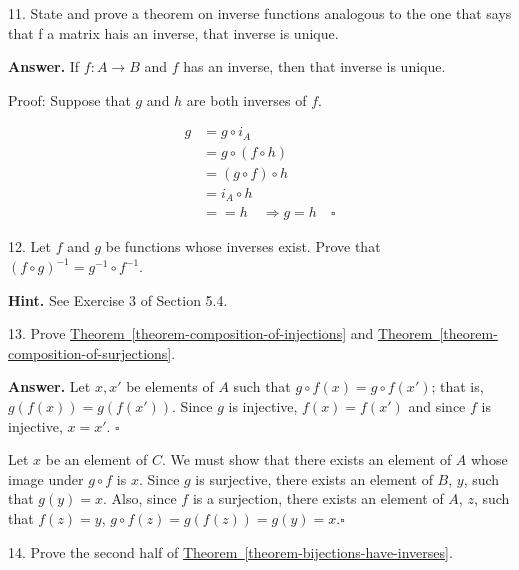\documentclass[10pt,]{book}
\theoremstyle{plain}
\theoremstyle{definition}
\theoremstyle{definition}
\theoremstyle{definition}
\begin{document}
\begin{exercisegroup}
\item[11.]\hypertarget{exercise-33}{}State and prove a theorem on inverse functions analogous to the one that says that f a matrix hais an inverse, that inverse is unique.%
\par\smallskip
\par\smallskip
\noindent\textbf{Answer.}\hypertarget{answer-14}{}\quad
If \(f:A\to B\) and \(f\) has an inverse, then that inverse is unique.%
\par
Proof:  Suppose that \(g\) and \(h\) are both inverses of \(f\).

\[
\begin{split}g &= g\circ i_A \\
		& =g\circ (f\circ h)\\
		& =(g\circ f)\circ h\\
		& =i_A\circ h\\
		& = =h\quad \Rightarrow g=h \quad \square
\end{split}
\]
\item[12.]\hypertarget{exercise-34}{} Let \(f\) and \(g\) be functions whose inverses exist. Prove that \((f\circ g)^{-1}= g^{-1}\circ f^{-1}\).%
\par\smallskip
\par\smallskip
\noindent\textbf{Hint.}\hypertarget{hint-2}{}\quad
See Exercise 3 of Section 5.4.%
\item[13.]\hypertarget{exercise-35}{} Prove \hyperref[theorem-composition-of-injections]{Theorem~\ref{theorem-composition-of-injections}} and \hyperref[theorem-composition-of-surjections]{Theorem~\ref{theorem-composition-of-surjections}}.%
\par\smallskip
\par\smallskip
\noindent\textbf{Answer.}\hypertarget{answer-15}{}\quad
 Let \(x,x'\) be elements of \(A\) such that \(g\circ f(x)=g\circ f(x')\); that is, \(g(f(x))=g(f(x'))\). Since \(g\) is injective, \(f(x)=f(x')\) and since \(f\) is injective, \(x=x'\). \(\square\)%
\par
 Let \(x\) be an element of \(C\). We must show that there exists an element of \(A\) whose image under \(g\circ f\) is \(x\). Since \(g\) is surjective, there exists an element of \(B\), \(y\), such that \(g(y)=x\). Also, since \(f\) is a surjection, there exists an element of \(A\), \(z\), such that \(f(z)=y\), \(g\circ f(z)=g(f(z))=g(y)=x\).\(\square\)%
\item[14.]\hypertarget{exercise-36}{} Prove the second half of \hyperref[theorem-bijections-have-inverses]{Theorem~\ref{theorem-bijections-have-inverses}}.%

\end{exercisegroup}
\end{document}
